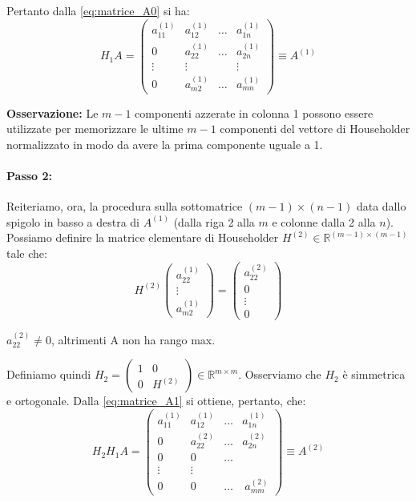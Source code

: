 Pertanto dalla \eqref{eq:matrice_A0} si ha:
\begin{equation}\label{eq:matrice_A1}
    H_1 A = \begin{pmatrix} a_{11}^{(1)} & a_{12}^{(1)} & \dots & a_{1n}^{(1)} \\ 0 & a_{22}^{(1)} & \dots & a_{2n}^{(1)} \\ \vdots & \vdots & & \vdots \\ 0 & a_{m2}^{(1)} & \dots & a_{mn}^{(1)} \end{pmatrix} \equiv A^{(1)} 
\end{equation}

\textbf{Osservazione:} Le $m-1$ componenti azzerate in colonna 1 possono essere utilizzate per memorizzare le ultime $m-1$ componenti del vettore di Householder normalizzato in modo da avere la prima componente uguale a 1.

\paragraph{Passo 2:}
Reiteriamo, ora, la procedura sulla sottomatrice $(m-1) \times (n-1)$ data dallo spigolo in basso a destra di $A^{(1)}$ (dalla riga 2 alla $m$ e colonne dalla 2 alla $n$).
Possiamo definire la matrice elementare di Householder $H^{(2)} \in \mathbb{R}^{(m-1) \times (m-1)}$ tale che:
$$ H^{(2)} \begin{pmatrix} a_{22}^{(1)} \\ \vdots \\ a_{m2}^{(1)} \end{pmatrix} = \begin{pmatrix} a_{22}^{(2)} \\ 0 \\ \vdots \\ 0 \end{pmatrix} $$
\begin{osservazione}
    $a_{22}^{(2)} \neq 0$, altrimenti A non ha rango max.
\end{osservazione}
Definiamo quindi $H_2 = \begin{pmatrix} 1 & 0 \\ 0 & H^{(2)} \end{pmatrix} \in \mathbb{R}^{m \times m}$.
Osserviamo che $H_2$ è simmetrica e ortogonale. Dalla \eqref{eq:matrice_A1} si ottiene, pertanto, che:
$$ H_2 H_1 A = \begin{pmatrix} a_{11}^{(1)} & a_{12}^{(1)} & \dots & a_{1n}^{(1)}\\ 0 & a_{22}^{(2)} & \dots & a_{2n}^{(2)} \\ 0 & 0 & \dots \\ \vdots & \vdots & \\ 0 & 0 & \dots & \ a_{mm}^{(2)} \end{pmatrix} \equiv A^{(2)} $$

